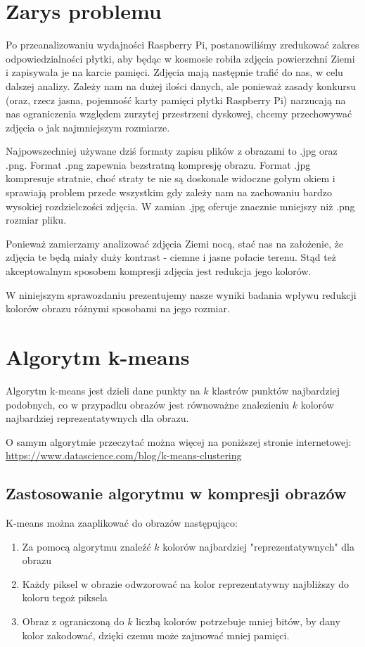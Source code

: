 \section{Zarys problemu}

Po przeanalizowaniu wydajności Raspberry Pi, postanowiliśmy zredukować zakres odpowiedzialności płytki, aby będąc w kosmosie robiła zdjęcia powierzchni Ziemi i zapisywała je na karcie pamięci.
Zdjęcia mają następnie trafić do nas, w celu dalszej analizy.
Zależy nam na dużej ilości danych, ale ponieważ zasady konkursu (oraz, rzecz jasna, pojemność karty pamięci płytki Raspberry Pi) narzucają na nas ograniczenia względem zurzytej przestrzeni dyskowej,
chcemy przechowywać zdjęcia o jak najmniejszym rozmiarze.

Najpowszechniej używane dziś formaty zapisu plików z obrazami to .jpg oraz .png. Format .png zapewnia bezstratną kompresję obrazu. Format .jpg kompresuje stratnie, choć straty te nie są doskonale widoczne gołym okiem i sprawiają problem przede wszystkim gdy zależy nam na zachowaniu bardzo wysokiej rozdzielczości zdjęcia. W zamian .jpg oferuje znacznie mniejszy niż .png rozmiar pliku.

Ponieważ zamierzamy analizować zdjęcia Ziemi nocą, stać nas na założenie, że zdjęcia te będą miały duży kontrast - ciemne i jasne połacie terenu. Stąd też akceptowalnym sposobem kompresji zdjęcia jest redukcja jego kolorów.

W niniejszym sprawozdaniu prezentujemy nasze wyniki badania wpływu redukcji kolorów obrazu różnymi sposobami na jego rozmiar.

\section{Algorytm k-means}

Algorytm k-means jest dzieli dane punkty na $k$ klastrów punktów najbardziej podobnych, co w przypadku obrazów jest równoważne
znalezieniu $k$ kolorów najbardziej reprezentatywnych dla obrazu.

O samym algorytmie przeczytać można więcej na poniższej stronie internetowej: \url{https://www.datascience.com/blog/k-means-clustering}

\subsection{Zastosowanie algorytmu w kompresji obrazów}
K-means można zaaplikować do obrazów następująco:

\begin{enumerate}
\item Za pomocą algorytmu znaleźć $k$ kolorów najbardziej "reprezentatywnych" dla obrazu
\item Każdy piksel w obrazie odwzorować na kolor reprezentatywny najbliższy do koloru tegoż piksela
\item Obraz z ograniczoną do $k$ liczbą kolorów potrzebuje mniej bitów, by dany kolor zakodować, dzięki czemu może zajmować mniej pamięci.
\end{enumerate}

